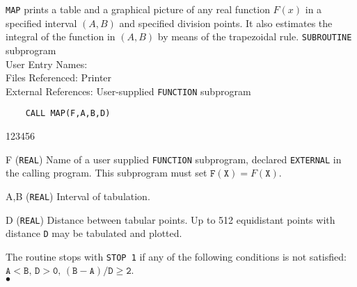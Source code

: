                         
                   
\Submitter{}                          
                     
{\tt MAP} prints a table and a graphical picture of any real
function $F(x)$ in a specified interval $(A,B)$ and specified division
points. It also estimates the integral of the function in $(A,B)$
by means of the trapezoidal rule.
\Structure
{\tt SUBROUTINE} subprogram \\
User Entry Names: \\
Files Referenced: Printer \\
External References: User-supplied {\tt FUNCTION} subprogram
\Usage
\begin{verbatim}
    CALL MAP(F,A,B,D)
\end{verbatim}
\begin{DLtt}{123456}
\item [F] ({\tt REAL}) Name of a user supplied {\tt FUNCTION}
subprogram, declared {\tt EXTERNAL} in the calling program.
This subprogram must set $\mathtt{F(X)} = F(\mathtt{X})$.
\item [A,B] ({\tt REAL}) Interval of tabulation.
\item [D] ({\tt REAL})  Distance between tabular points. Up to 512
equidistant points with distance {\tt D} may be tabulated and plotted.
\end{DLtt}
\Errorh
The routine stops with  {\tt STOP 1} if any of  the following conditions
is not satisfied: \\
$\mathtt{A < B,\,D > 0,\,(B-A)/D \geq 2}$.
\\ $\bullet$
